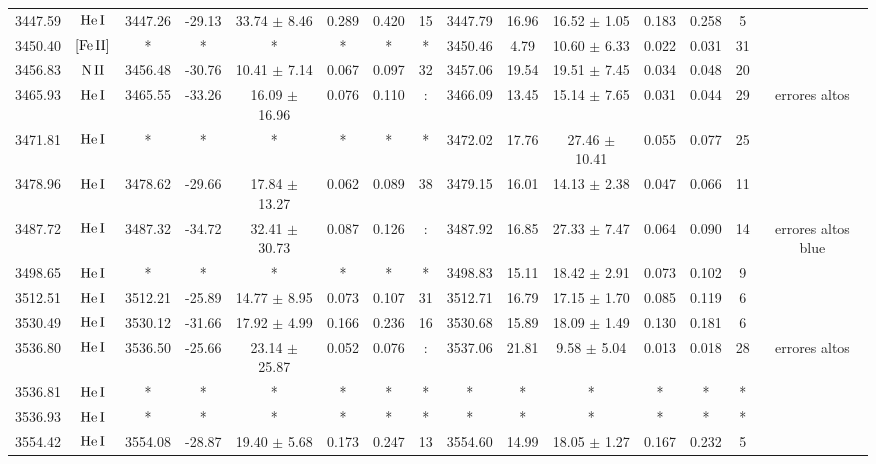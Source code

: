 \documentclass{article}
\begin{document}
\begin{table*}
\begin{adjustbox}{width=\textwidth}
\begin{tabular}{ccccccccccccccc}
3447.59 & $\mbox{He}\thinspace \mbox{I}$ & 3447.26 & -29.13 & 33.74 $\pm$ 8.46 & 0.289 & 0.420 & 15 & 3447.79 & 16.96 & 16.52 $\pm$ 1.05 & 0.183 & 0.258 & 5 &  \\
3450.40 & $\mbox{[Fe}\thinspace \mbox{II]}$ & * & * & * & * & * & * & 3450.46 & 4.79 & 10.60 $\pm$ 6.33 & 0.022 & 0.031 & 31 &  \\
3456.83 & $\mbox{N}\thinspace \mbox{II}$ & 3456.48 & -30.76 & 10.41 $\pm$ 7.14 & 0.067 & 0.097 & 32 & 3457.06 & 19.54 & 19.51 $\pm$ 7.45 & 0.034 & 0.048 & 20 &  \\
3465.93 & $\mbox{He}\thinspace \mbox{I}$ & 3465.55 & -33.26 & 16.09 $\pm$ 16.96 & 0.076 & 0.110 & : & 3466.09 & 13.45 & 15.14 $\pm$ 7.65 & 0.031 & 0.044 & 29 &  errores altos \\
3471.81 & $\mbox{He}\thinspace \mbox{I}$ & * & * & * & * & * & * & 3472.02 & 17.76 & 27.46 $\pm$ 10.41 & 0.055 & 0.077 & 25 &  \\
3478.96 & $\mbox{He}\thinspace \mbox{I}$ & 3478.62 & -29.66 & 17.84 $\pm$ 13.27 & 0.062 & 0.089 & 38 & 3479.15 & 16.01 & 14.13 $\pm$ 2.38 & 0.047 & 0.066 & 11 &  \\
3487.72 & $\mbox{He}\thinspace \mbox{I}$ & 3487.32 & -34.72 & 32.41 $\pm$ 30.73 & 0.087 & 0.126 & : & 3487.92 & 16.85 & 27.33 $\pm$ 7.47 & 0.064 & 0.090 & 14 &  errores altos blue \\
3498.65 & $\mbox{He}\thinspace \mbox{I}$ & * & * & * & * & * & * & 3498.83 & 15.11 & 18.42 $\pm$ 2.91 & 0.073 & 0.102 & 9 &  \\
3512.51 & $\mbox{He}\thinspace \mbox{I}$ & 3512.21 & -25.89 & 14.77 $\pm$ 8.95 & 0.073 & 0.107 & 31 & 3512.71 & 16.79 & 17.15 $\pm$ 1.70 & 0.085 & 0.119 & 6 &  \\
3530.49 & $\mbox{He}\thinspace \mbox{I}$ & 3530.12 & -31.66 & 17.92 $\pm$ 4.99 & 0.166 & 0.236 & 16 & 3530.68 & 15.89 & 18.09 $\pm$ 1.49 & 0.130 & 0.181 & 6 &  \\
3536.80 & $\mbox{He}\thinspace \mbox{I}$ & 3536.50 & -25.66 & 23.14 $\pm$ 25.87 & 0.052 & 0.076 & : & 3537.06 & 21.81 & 9.58 $\pm$ 5.04 & 0.013 & 0.018 & 28 &  errores altos \\
3536.81 & $\mbox{He}\thinspace \mbox{I}$ & * & * & * & * & * & * & * & * & * & * & * & * &  \\
3536.93 & $\mbox{He}\thinspace \mbox{I}$ & * & * & * & * & * & * & * & * & * & * & * & * &  \\
3554.42 & $\mbox{He}\thinspace \mbox{I}$ & 3554.08 & -28.87 & 19.40 $\pm$ 5.68 & 0.173 & 0.247 & 13 & 3554.60 & 14.99 & 18.05 $\pm$ 1.27 & 0.167 & 0.232 & 5 &  \\

\end{tabular}
\end{adjustbox}
\end{table*}
\end{document}
